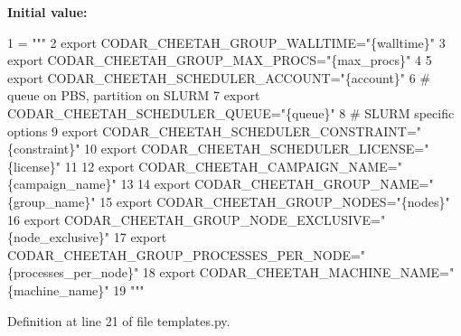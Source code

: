 {\bfseries Initial value\+:}
\begin{DoxyCode}
1 =  \textcolor{stringliteral}{"""}
2 \textcolor{stringliteral}{export CODAR\_CHEETAH\_GROUP\_WALLTIME="\{walltime\}"}
3 \textcolor{stringliteral}{export CODAR\_CHEETAH\_GROUP\_MAX\_PROCS="\{max\_procs\}"}
4 \textcolor{stringliteral}{}
5 \textcolor{stringliteral}{export CODAR\_CHEETAH\_SCHEDULER\_ACCOUNT="\{account\}"}
6 \textcolor{stringliteral}{# queue on PBS, partition on SLURM}
7 \textcolor{stringliteral}{export CODAR\_CHEETAH\_SCHEDULER\_QUEUE="\{queue\}"}
8 \textcolor{stringliteral}{# SLURM specific options}
9 \textcolor{stringliteral}{export CODAR\_CHEETAH\_SCHEDULER\_CONSTRAINT="\{constraint\}"}
10 \textcolor{stringliteral}{export CODAR\_CHEETAH\_SCHEDULER\_LICENSE="\{license\}"}
11 \textcolor{stringliteral}{}
12 \textcolor{stringliteral}{export CODAR\_CHEETAH\_CAMPAIGN\_NAME="\{campaign\_name\}"}
13 \textcolor{stringliteral}{}
14 \textcolor{stringliteral}{export CODAR\_CHEETAH\_GROUP\_NAME="\{group\_name\}"}
15 \textcolor{stringliteral}{export CODAR\_CHEETAH\_GROUP\_NODES="\{nodes\}"}
16 \textcolor{stringliteral}{export CODAR\_CHEETAH\_GROUP\_NODE\_EXCLUSIVE="\{node\_exclusive\}"}
17 \textcolor{stringliteral}{export CODAR\_CHEETAH\_GROUP\_PROCESSES\_PER\_NODE="\{processes\_per\_node\}"}
18 \textcolor{stringliteral}{export CODAR\_CHEETAH\_MACHINE\_NAME="\{machine\_name\}"}
19 \textcolor{stringliteral}{"""}
\end{DoxyCode}


Definition at line 21 of file templates.\+py.

